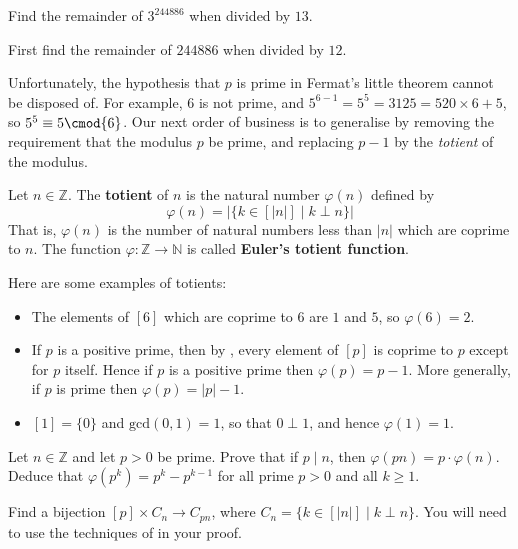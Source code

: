 \begin{exercise}
\label{RemainderOfThreeExpBigRemThirteen}
Find the remainder of $3^{244886}$ when divided by $13$.
\begin{backhint}
First find the remainder of $244886$ when divided by $12$.
\end{backhint}
\end{exercise}

Unfortunately, the hypothesis that $p$ is prime in Fermat's little theorem cannot be disposed of. For example, $6$ is not prime, and $5^{6-1} = 5^5 = 3125 = 520 \times 6 + 5$, so $5^5 \equiv 5 \cmod{6}$. Our next order of business is to generalise  by removing the requirement that the modulus $p$ be prime, and replacing $p-1$ by the \textit{totient} of the modulus.

\begin{definition}
\label{defTotient}
Let $n \in \mathbb{Z}$. The \textbf{totient} of $n$ is the natural number $\varphi(n)$  defined by
\[ \varphi(n) = | \{ k \in [ |n| ] \mid k \perp n \}| \]
That is, $\varphi(n)$ is the number of natural numbers less than $|n|$ which are coprime to $n$. The function $\varphi : \mathbb{Z} \to \mathbb{N}$ is called \textbf{Euler's totient function}.
\end{definition}

\begin{example}
\label{exComputationsOfTotients}
Here are some examples of totients:
\begin{itemize}
\item The elements of $[6]$ which are coprime to $6$ are $1$ and $5$, so $\varphi(6)=2$.
\item If $p$ is a positive prime, then by , every element of $[p]$ is coprime to $p$ except for $p$ itself. Hence if $p$ is a positive prime then $\varphi(p)=p-1$. More generally, if $p$ is prime then $\varphi(p) = |p|-1$.
\item $[1] = \{ 0 \}$ and $\mathrm{gcd}(0,1) = 1$, so that $0 \perp 1$, and hence $\varphi(1) = 1$.
\end{itemize}
\end{example}

\begin{exercise}
\label{exTotientMultiplyByPrime}
Let $n \in \mathbb{Z}$ and let $p > 0$ be prime. Prove that if $p \mid n$, then $\varphi(pn) = p \cdot \varphi(n)$. Deduce that $\varphi(p^k) = p^k-p^{k-1}$ for all prime $p>0$ and all $k \ge 1$.
\begin{backhint}
Find a bijection $[p] \times C_n \to C_{pn}$, where $C_n = \{ k \in [|n|] \mid k \perp n \}$. You will need to use the techniques of  in your proof.
\end{backhint}
\end{exercise}

